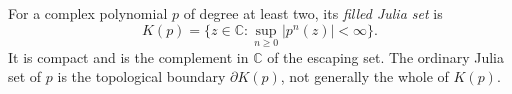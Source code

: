 
For a complex polynomial $p$ of degree at least two, its \emph{filled Julia set} is
\[
K(p)=\{z\in\mathbb C:\sup_{n\ge0}|p^n(z)|<\infty\}.
\]
It is compact and is the complement in $\mathbb C$ of the escaping set. The ordinary Julia set of $p$ is the topological boundary $\partial K(p)$, not generally the whole of $K(p)$.
